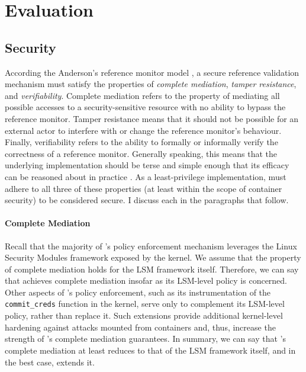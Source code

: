 \section{Evaluation}
\label{sec:eval}

\subsection{Security}

According the Anderson's reference monitor model \cite{anderson1973_planning_study}, a secure reference validation mechanism must satisfy the properties of \textit{complete mediation}, \textit{tamper resistance}, and \textit{verifiability}. Complete mediation refers to the property of mediating all possible accesses to a security-sensitive resource with no ability to bypass the reference monitor. Tamper resistance means that it should not be possible for an external actor to interfere with or change the reference monitor's behaviour. Finally, verifiability refers to the ability to formally or informally verify the correctness of a reference monitor. Generally speaking, this means that the underlying implementation should be terse and simple enough that its efficacy can be reasoned about in practice \cite{jaeger2011_reference_monitor}. As a least-privilege implementation, \bpfcontain{} must adhere to all three of these properties (at least within the scope of container security) to be considered secure. I discuss each in the paragraphs that follow.

\paragraph*{Complete Mediation}

Recall that the majority of \bpfcontain{}'s policy enforcement mechanism leverages the Linux Security Modules framework exposed by the kernel. We assume that the property of complete mediation holds for the LSM framework itself. Therefore, we can say that \bpfcontain{} achieves complete mediation insofar as its LSM-level policy is concerned. Other aspects of \bpfcontain{}'s policy enforcement, such as its instrumentation of the \texttt{commit\_creds} function in the kernel, serve only to complement its LSM-level policy, rather than replace it. Such extensions provide additional kernel-level hardening against attacks mounted from containers and, thus, increase the strength of \bpfcontain{}'s complete mediation guarantees. In summary, we can say that \bpfcontain{}'s complete mediation at least reduces to that of the LSM framework itself, and in the best case, extends it.

